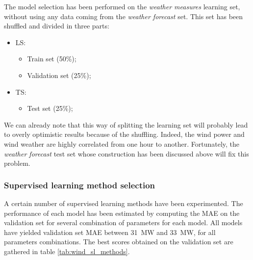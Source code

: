 \documentclass[a4paper, 12pt]{article}
\begin{document}
	The model selection has been performed on the \emph{weather measures} learning set, without using any data coming from the \emph{weather forecast} set. This set has been shuffled and divided in three parts: 
	\begin{itemize}
		\item LS:
		\begin{itemize}
		    \item Train set (50\%);
		    \item Validation set (25\%);\\
		\end{itemize}
		\item{TS:}
		\begin{itemize}
		    \item Test set (25\%);
		\end{itemize}
	\end{itemize}
	We can already note that this way of splitting the learning set will probably lead to overly optimistic results because of the shuffling. Indeed, the wind power and wind weather are highly correlated from one hour to another. Fortunately, the \emph{weather forecast} test set whose construction has been discussed above will fix this problem.
	

	\subsubsection{Supervised learning method selection}

	A certain number of supervised learning methods have been experimented. The performance of each model has been estimated by computing the MAE on the validation set for several combination of parameters for each model. All models have yielded validation set MAE between \SI{31}{\mega \watt} and \SI{33}{\mega \watt}, for all parameters combinations. The best scores obtained on the validation set are gathered in table \ref{tab:wind_sl_methods}.
	
\end{document}
